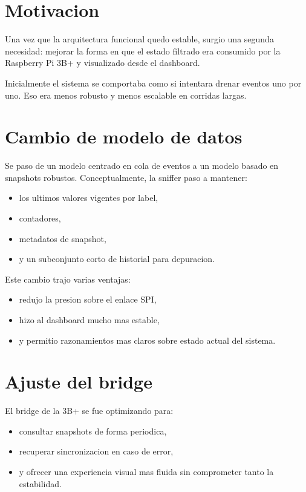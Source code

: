 \documentclass[12pt,a4paper,oneside]{report}
\begin{document}
\section{Motivacion}

Una vez que la arquitectura funcional quedo estable, surgio una segunda necesidad: mejorar la forma en que el estado filtrado era consumido por la Raspberry Pi 3B+ y visualizado desde el dashboard.

Inicialmente el sistema se comportaba como si intentara drenar eventos uno por uno. Eso era menos robusto y menos escalable en corridas largas.

\section{Cambio de modelo de datos}

Se paso de un modelo centrado en cola de eventos a un modelo basado en snapshots robustos. Conceptualmente, la sniffer paso a mantener:

\begin{itemize}[leftmargin=1.2cm]
    \item los ultimos valores vigentes por label,
    \item contadores,
    \item metadatos de snapshot,
    \item y un subconjunto corto de historial para depuracion.
\end{itemize}

Este cambio trajo varias ventajas:

\begin{itemize}[leftmargin=1.2cm]
    \item redujo la presion sobre el enlace SPI,
    \item hizo al dashboard mucho mas estable,
    \item y permitio razonamientos mas claros sobre estado actual del sistema.
\end{itemize}

\section{Ajuste del bridge}

El bridge de la 3B+ se fue optimizando para:

\begin{itemize}[leftmargin=1.2cm]
    \item consultar snapshots de forma periodica,
    \item recuperar sincronizacion en caso de error,
    \item y ofrecer una experiencia visual mas fluida sin comprometer tanto la estabilidad.
\end{itemize}
\end{document}
